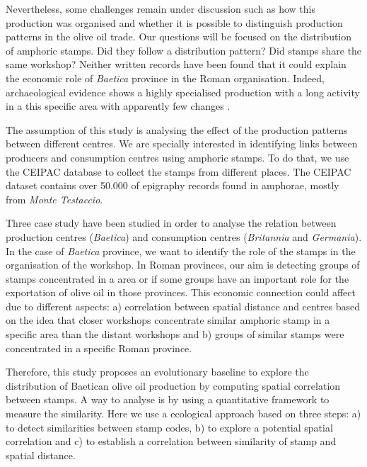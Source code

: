\documentclass[review]{elsarticle}
\begin{document}
Nevertheless, some challenges remain under discussion such as how this production was organised and whether it is possible to distinguish production patterns in the olive oil trade. Our questions will be focused on the distribution of amphoric stamps. Did they follow a distribution pattern? Did stamps share the same workshop? Neither written records have been found that it could explain the economic role of \textit{Baetica} province in the Roman organisation. Indeed, archaeological evidence shows a highly specialised production with a long activity in a this specific area with apparently few changes \citep{remesal_anforas_2004}. 


The assumption of this study is analysing the effect of the production patterns between different centres. We are specially interested in identifying links between producers and consumption centres using amphoric stamps. To do that, we use the CEIPAC database to collect the stamps from different places. The CEIPAC dataset contains over 50.000 of epigraphy records found in amphorae, mostly from \textit{Monte Testaccio}.

Three case study have been studied in order to analyse the relation between production centres (\textit{Baetica}) and consumption centres (\textit{Britannia} and \textit{Germania}). In the case of \textit{Baetica} province, we want to identify the role of the stamps in the organisation of the workshop. In Roman provinces, our aim is detecting groups of stamps concentrated in a area or if some groups have an important role for the exportation of olive oil in those provinces. This economic connection could affect due to different aspects: a) correlation between spatial distance and centres based on the idea that closer workshops concentrate similar amphoric stamp in a specific area than the distant workshops and b) groups of similar stamps were concentrated in a specific Roman province. 

Therefore, this study proposes an evolutionary baseline to explore the distribution of Baetican olive oil production by computing spatial correlation between stamps. A way to analyse is by using a quantitative framework to measure the similarity. Here we use a ecological approach based on three steps: a) to detect similarities between stamp codes, b)     to explore a potential spatial correlation and c) to establish a correlation between similarity of stamp and spatial distance. 
\end{document}
